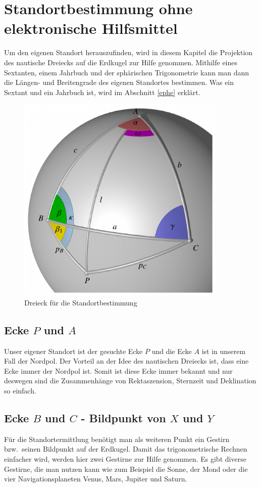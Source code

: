 \section{Standortbestimmung ohne elektronische Hilfsmittel}
\label{sta}
Um den eigenen Standort herauszufinden, wird in diesem Kapitel die Projektion des nautische Dreiecks auf die Erdkugel zur Hilfe genommen.
Mithilfe eines Sextanten, einem Jahrbuch und der sphärischen Trigonometrie kann man dann die Längen- und Breitengrade des eigenen Standortes bestimmen.
Was ein Sextant und ein Jahrbuch ist, wird im Abschnitt \ref{ephe} erklärt.
%
\begin{figure}
\centering
	\includegraphics[width=10cm]{papers/nav/images/dreieck3d8.pdf}
	\caption[Dreieck für die Standortbestimmung]{Dreieck für die Standortbestimmung}
	\label{d1}
\end{figure}




\subsection{Ecke $P$ und $A$}
Unser eigener Standort ist der gesuchte Ecke $P$ und die Ecke $A$ ist in unserem Fall der Nordpol.
Der Vorteil an der Idee des nautischen Dreiecks ist, dass eine Ecke immer der Nordpol ist.
Somit ist diese Ecke immer bekannt und nur deswegen sind die Zusammenhänge von Rektaszension, Sternzeit und Deklination so einfach.

\subsection{Ecke $B$ und $C$ - Bildpunkt von $X$ und $Y$}
Für die Standortermittlung benötigt man als weiteren Punkt ein Gestirn
bzw.~seinen Bildpunkt auf der Erdkugel. 
Damit das trigonometrische Rechnen einfacher wird, werden hier zwei Gestirne zur Hilfe genommen.
Es gibt diverse Gestirne, die man nutzen kann wie zum Beispiel die Sonne, der Mond oder die vier Navigationsplaneten Venus, Mars, Jupiter und Saturn.


